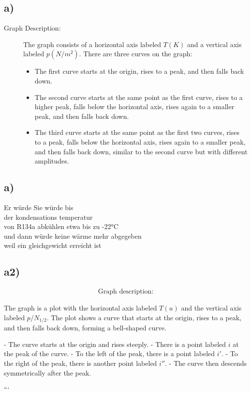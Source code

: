 

\subsection*{a)}

\begin{description}
    \item[Graph Description:] The graph consists of a horizontal axis labeled \( T(K) \) and a vertical axis labeled \( p(N/m^2) \). There are three curves on the graph:
    \begin{itemize}
        \item The first curve starts at the origin, rises to a peak, and then falls back down.
        \item The second curve starts at the same point as the first curve, rises to a higher peak, falls below the horizontal axis, rises again to a smaller peak, and then falls back down.
        \item The third curve starts at the same point as the first two curves, rises to a peak, falls below the horizontal axis, rises again to a smaller peak, and then falls back down, similar to the second curve but with different amplitudes.
    \end{itemize}
\end{description}



\subsection*{a)}
Er würde Sie würde bis \\
der kondensations temperatur \\
von R134a abkühlen etwa bis zu -22°C \\
und dann würde keine wärme mehr abgegeben \\
weil ein gleichgewicht erreicht ist

\subsection*{a2)}
\[
\begin{array}{c}
\text{Graph description:}
\end{array}
\]

The graph is a plot with the horizontal axis labeled \( T (u) \) and the vertical axis labeled \( p / N_{1/2} \). The plot shows a curve that starts at the origin, rises to a peak, and then falls back down, forming a bell-shaped curve. 

- The curve starts at the origin and rises steeply.
- There is a point labeled \( i \) at the peak of the curve.
- To the left of the peak, there is a point labeled \( i' \).
- To the right of the peak, there is another point labeled \( i'' \).
- The curve then descends symmetrically after the peak.

```